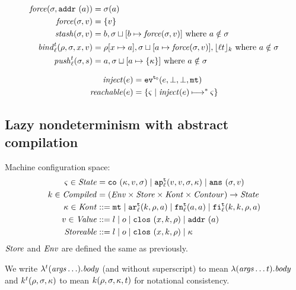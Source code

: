 \documentclass{llncs}
\newcommand{\inject}{\mathit{inject}}
\newcommand{\setof}[1]{\{ #1 \}}
\newcommand{\alt}{\mid}
\begin{document}
\begin{align*}
\mathit{force}(\sigma,{\tt addr{\ }}({a})) &= \sigma(a) \\
\mathit{force}(\sigma,v) &= \{ v \} \\
\mathit{stash}(\sigma,v) &= b, \sigma\sqcup[b \mapsto \mathit{force}(\sigma, v)]
\mbox{ where }a \notin\sigma \\
\mathit{bind}_{\ell}^{t}(\rho,\sigma,x,v) &= \rho[x\mapsto a],\sigma\sqcup[a\mapsto\mathit{force}(\sigma,v)],\lfloor {\ell}{t} \rfloor_k
\mbox{ where }a \notin\sigma \\
\mathit{push}_{\ell}^{t}(\sigma,s) &= a,\sigma\sqcup[a\mapsto\{\kappa\}]
\mbox{ where }a \notin\sigma
\end{align*}

\begin{align*}
\inject(\mexp) &= \ev[^\mtcntr]{\mexp,\bot,\bot,\kmt} \\
\reachable{\mexp} &= \setof{\mstate \mid \inject(\mexp) \machstep^* \mstate}
\end{align*}

\subsection{Lazy nondeterminism with abstract compilation}

Machine configuration space:
\begin{align*}
\mstate \in \State &= \co{\mkont, \mval, \msto} \alt
                     \ap[_\mlab^\mcntr]{\mval,\mval,\msto,\mkont} \alt
                     \ans{\msto, \mval}\\
\mcomp \in \Compiled &= (\Env \times \Store \times \Kont \times \Counter) \to \State \\
\mkont \in \Kont &::= \kmt \alt
                      \kar[_\mlab^\mcntr]{\mcomp, \menv, \maddr} \alt
                      \kfn[_\mlab^\mcntr]{\maddr, \maddr} \alt
                      \kif[_\mlab^\mcntr]{\mcomp, \mcomp, \menv, \maddr} \\
\mval \in \Value &::= \mlit \alt \mop \alt
                      \clos{\mvar,\mcomp,\menv} \alt
                      \saddr\maddr \\
\Storeable &::= \mlit \alt \mop \alt
                \clos{\mvar,\mcomp,\menv} \alt
                \mkont \\
\end{align*}
$\mathit{Store}$ and $\mathit{Env}$ are defined the same as previously.

We write $\lambda^{t}(\mathit{args}\ldots). \mathit{body}$ (and without superscript) to mean
$\lambda(\mathit{args}\ldots {t}). \mathit{body}$ and
$k^{t}(\rho, \sigma, \kappa)$ to mean $k(\rho, \sigma,
\kappa, {t})$ for notational consistency.
\end{document}
